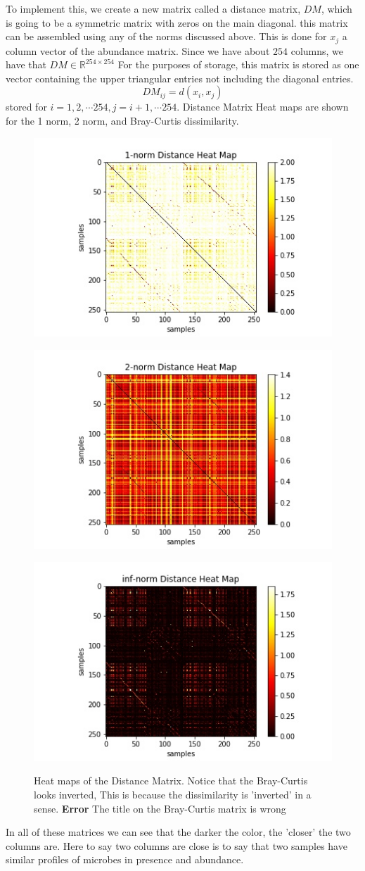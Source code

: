 \documentclass{article}
\newcommand{\R}{\mathbb{R}}
\theoremstyle{definition} \newtheorem*{lte}{Definition}
\theoremstyle{plain} \newtheorem*{csbt}{Theorem}
\begin{document}
To implement this, we create a new matrix called a distance matrix,  $DM$, which is going to be a symmetric matrix with zeros on the main diagonal. this matrix can be assembled using any of the norms discussed above. This is done for $x_j$ a column vector of the abundance matrix. Since we have about $254$ columns, we have that $DM \in \R^{254 \times 254}$ For the purposes of storage, this matrix is stored as one vector containing the upper triangular entries not including the diagonal entries. 
$$DM_{ij} = d(x_i, x_j)$$
stored for $i = 1, 2, \cdots 254, j = i+1, \cdots 254$. 
Distance Matrix Heat maps are shown for the 1 norm, 2 norm, and Bray-Curtis dissimilarity. 
\begin{figure}[H]
\begin{center}
\begin{subfloat}{\includegraphics[width=.3\linewidth]{1normHeatmp.jpg}}
\end{subfloat}
\begin{subfloat}{\includegraphics[width=.3\linewidth]{2normHeatmp.jpg}}
\end{subfloat}
\begin{subfloat}{\includegraphics[width=.3\linewidth]{WikiBrayCurtisHeatmp.jpg}}
\end{subfloat}
\caption{ Heat maps of the Distance Matrix. Notice that the Bray-Curtis looks inverted, This is because the dissimilarity is 'inverted' in a sense. \textbf{ Error} The title on the Bray-Curtis matrix is wrong }
\end{center}
\end{figure}

In all of these matrices we can see that the darker the color, the 'closer' the two columns are. Here to say two columns are close is to say that two samples have similar profiles of microbes in presence and abundance. 
\end{document}
